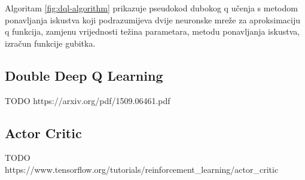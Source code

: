 Algoritam \ref{fig:dql-algorithm} prikazuje pseudokod dubokog q učenja s metodom ponavljanja iskustva koji podrazumijeva dvije neuronske mreže za aproksimaciju q funkcija, zamjenu vrijednosti težina parametara, metodu ponavljanja iskustva, izračun funkcije gubitka. 


\subsection{Double Deep Q Learning}

TODO https://arxiv.org/pdf/1509.06461.pdf

\subsection{Actor Critic}

TODO https://www.tensorflow.org/tutorials/reinforcement_learning/actor_critic
